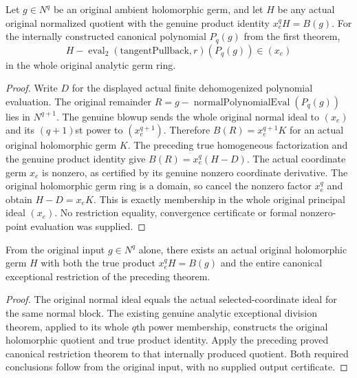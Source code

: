 \begin{theorem}
\label{hir:actual-normal-quotient-canonical-exceptional-restriction}
Let $g\in N^q$ be an original ambient holomorphic germ, and let $H$
be any actual original normalized quotient with the genuine product
identity $x_e^qH=B(g)$. For the internally constructed canonical
polynomial $P_q(g)$ from the first theorem,
\[
 H-\operatorname{eval}_2(\mathrm{tangentPullback},r)(P_q(g))
 \in (x_e)
\]
in the whole original analytic germ ring.
\leanok
\end{theorem}
\begin{proof}
Write $D$ for the displayed actual finite dehomogenized polynomial
evaluation. The original remainder $R=g-\operatorname{normalPolynomialEval}(P_q(g))$
lies in $N^{q+1}$. The genuine blowup sends the whole original normal
ideal to $(x_e)$ and its $(q+1)$st power to $(x_e^{q+1})$.
Therefore $B(R)=x_e^{q+1}K$ for an actual original holomorphic germ
$K$. The preceding true homogeneous factorization and the genuine
product identity give $B(R)=x_e^q(H-D)$. The actual coordinate germ
$x_e$ is nonzero, as certified by its genuine nonzero coordinate
derivative. The original holomorphic germ ring is a domain, so cancel
the nonzero factor $x_e^q$ and obtain $H-D=x_eK$. This is exactly
membership in the whole original principal ideal $(x_e)$. No
restriction equality, convergence certificate or formal nonzero-point
evaluation was supplied.
\end{proof}

\begin{theorem}
\label{hir:actual-normal-initial-quotient-exists-with-restriction}
From the original input $g\in N^q$ alone, there exists an actual
original holomorphic germ $H$ with both the true product
$x_e^qH=B(g)$ and the entire canonical exceptional restriction of the
preceding theorem.
\leanok
\end{theorem}
\begin{proof}
The original normal ideal equals the actual selected-coordinate ideal
for the same normal block. The existing genuine analytic exceptional
division theorem, applied to its whole $q$th power membership,
constructs the original holomorphic quotient and true product identity.
Apply the preceding proved canonical restriction theorem to that
internally produced quotient. Both required conclusions follow from
the original input, with no supplied output certificate.
\end{proof}

